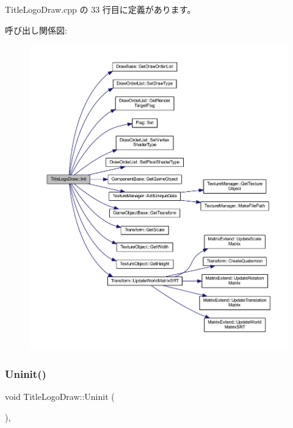  Title\+Logo\+Draw.\+cpp の 33 行目に定義があります。

呼び出し関係図\+:\nopagebreak
\begin{figure}[H]
\begin{center}
\leavevmode
\includegraphics[width=350pt]{class_title_logo_draw_a9f70fb70639510908f4e07ee14667e30_cgraph}
\end{center}
\end{figure}
\mbox{\label{class_title_logo_draw_a07bbf9e8de5c7b9ee028408496c13c50}} 
\subsubsection{\texorpdfstring{Uninit()}{Uninit()}}
{\footnotesize\ttfamily void Title\+Logo\+Draw\+::\+Uninit (\begin{DoxyParamCaption}{ }\end{DoxyParamCaption})\hspace{0.3cm}{\ttfamily [override]}, {\ttfamily [virtual]}}



